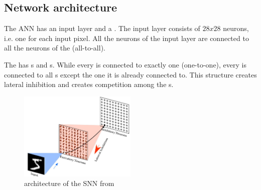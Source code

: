 \subsection{Network architecture}
\label{subsec:architecture}


The \ac{ANN} has an input layer and a \pLayer{} \cite{SNN}.
The input layer consists of $28 x 28$ neurons, i.e. one for each input pixel.
All the neurons of the input layer are connected to all the neurons of the \pLayer{} (all-to-all).

The \pLayer{} has \eN{}s and \iN{}s.
While every \eN{} is connected to exactly one \iN{} (one-to-one), every \iN{} is connected to all \eN{}s except the one it is already connected to.
This structure creates lateral inhibition and creates competition among the \eN{}s.

\begin{figure}[htbp]
    \center
    \includegraphics[width=0.5\textwidth]{pictures/architecture_SNN_erste_Quelle.jpg}
    \caption{architecture of the \ac{SNN} from \cite{SNN}}
    \label{fig:architecture_SNN}
\end{figure}